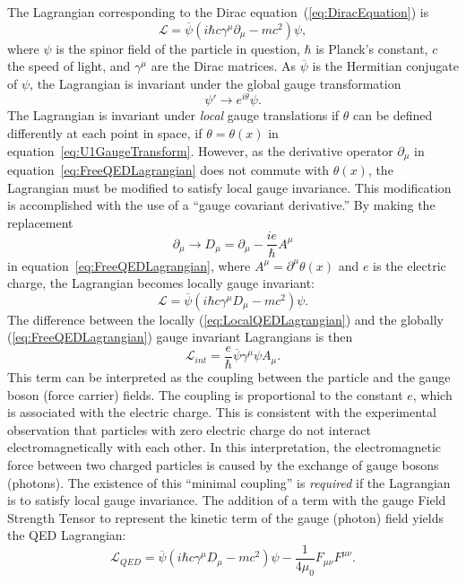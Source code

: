 The Lagrangian corresponding to the Dirac equation~(\ref{eq:DiracEquation}) is
\begin{equation}
  \mathcal{L} = \overline \psi (i\hbar c\gamma^\mu \partial_\mu - mc^2) \psi,
  \label{eq:FreeQEDLagrangian}
\end{equation}
where $\psi$ is the spinor field of the particle in question, $\hbar$ is Planck's
constant, $c$ the speed of light, and $\gamma^\mu$ are the Dirac matrices.  As
$\overline\psi$ is the Hermitian conjugate of $\psi$, the Lagrangian is invariant
under the global gauge transformation 
\begin{equation}
  \psi' \to e^{i\theta}\psi.
  \label{eq:U1GaugeTransform}
\end{equation}
The Lagrangian is invariant under \emph{local} gauge translations if $\theta$
can be defined differently at each point in space, \ie if $\theta = \theta(x)$
in equation~\ref{eq:U1GaugeTransform}.  However, as the derivative operator
$\partial_\mu$ in equation~\ref{eq:FreeQEDLagrangian} does not commute with
$\theta(x)$, the Lagrangian must be modified to satisfy local gauge invariance.
This modification is accomplished with the use of a ``gauge covariant
derivative.''  By making the replacement 
\begin{equation} 
  \partial_\mu \to D_\mu = \partial_\mu - \frac{ie}{\hbar}A^\mu      
\end{equation}
in equation~\ref{eq:FreeQEDLagrangian}, where 
$A^\mu = \partial^\mu \theta(x)$ and $e$ is the electric charge, the Lagrangian
becomes locally gauge invariant:
\begin{equation}
  \mathcal{L} = \overline \psi (i\hbar c\gamma^\mu D_\mu - mc^2) \psi.
  \label{eq:LocalQEDLagrangian}
\end{equation}
The difference between
the locally (\ref{eq:LocalQEDLagrangian}) and the globally 
(\ref{eq:FreeQEDLagrangian}) gauge invariant Lagrangians is then
\begin{equation}
  \mathcal{L}_{int} = \frac{e}{\hbar}\overline\psi\gamma^\mu\psi A_\mu.
\end{equation}
This term can be interpreted as the coupling between the particle and the gauge
boson (force carrier) fields.  The coupling is proportional to the constant $e$,
which is associated with the electric charge.  This is consistent with the
experimental observation that particles with zero electric charge do not
interact electromagnetically with each other.  In this interpretation, the
electromagnetic force between two charged particles is caused by the exchange of
gauge bosons (photons).  The existence of this ``minimal coupling'' is
\emph{required} if the Lagrangian is to satisfy local gauge invariance. The
addition of a term with the gauge Field Strength Tensor to represent the kinetic
term of the gauge (photon) field yields the QED Lagrangian:
\begin{equation}
  \mathcal{L}_{QED} = \overline \psi (i\hbar c\gamma^\mu D_\mu - mc^2) \psi -
  \frac{1}{4\mu_0}F_{\mu\nu}F^{\mu\nu}.
\end{equation}

